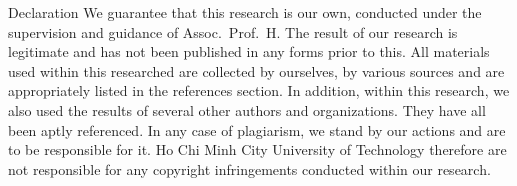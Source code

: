 \begin{preface}{Declaration}
  We guarantee that this research is our own, conducted under the supervision and guidance of Assoc.\ Prof.\ H. The result of our research is legitimate and has not been published in any forms prior to this. All materials used within this researched are collected by ourselves, by various sources and are appropriately listed in the references section. In addition, within this research, we also used the results of several other authors and organizations. They have all been aptly referenced. In any case of plagiarism, we stand by our actions and are to be responsible for it. Ho Chi Minh City University of Technology therefore are not responsible for any copyright infringements conducted within our research.
\end{preface}
